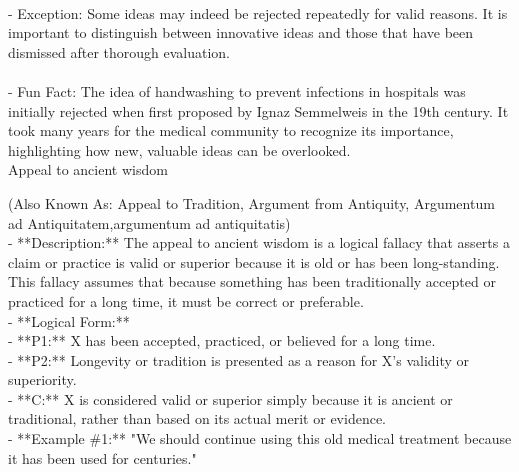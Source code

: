 \documentclass[a4paper,12pt,single,pdftex]{scrbook}
\begin{document}
    
      
    \\

    
      - Exception: Some ideas may indeed be rejected repeatedly for valid reasons. It is important to distinguish between innovative ideas and those that have been dismissed after thorough evaluation.
    \\

    
      
    \\

    
      - Fun Fact: The idea of handwashing to prevent infections in hospitals was initially rejected when first proposed by Ignaz Semmelweis in the 19th century. It took many years for the medical community to recognize its importance, highlighting how new, valuable ideas can be overlooked.
    \\

  

Appeal to ancient wisdom
    
      (Also Known As: Appeal to Tradition, Argument from Antiquity, Argumentum ad Antiquitatem,argumentum ad antiquitatis)
    \\

  
    
      - **Description:** The appeal to ancient wisdom is a logical fallacy that asserts a claim or practice is valid or superior because it is old or has been long-standing. This fallacy assumes that because something has been traditionally accepted or practiced for a long time, it must be correct or preferable.
    \\

    
      - **Logical Form:**
    \\

    
        - **P1:** X has been accepted, practiced, or believed for a long time.
    \\

    
        - **P2:** Longevity or tradition is presented as a reason for X’s validity or superiority.
    \\

    
        - **C:** X is considered valid or superior simply because it is ancient or traditional, rather than based on its actual merit or evidence.
    \\

    
      - **Example \#1:** "We should continue using this old medical treatment because it has been used for centuries."
    \\
\end{document}
